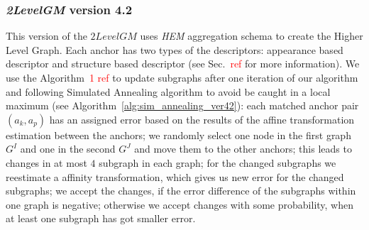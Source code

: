 \documentclass[
	fontsize=12pt,
	paper=a4,
	twoside=false,
	numbers=noenddot,
	plainheadsepline,
	toc=listof,
	toc=bibliography
]{scrartcl}
\newcommand\ToDo[1]{\textcolor{red}{#1}}
\begin{document}
\subsubsection{\emph{2LevelGM} version 4.2}

This version of the $2LevelGM$ uses \emph{HEM} aggregation schema to create the Higher Level Graph. Each anchor has two types of the descriptors: appearance based descriptor and structure based descriptor (see Sec.~\ToDo{ref} for more information). We use the Algorithm~\ToDo{1 ref} to update subgraphs after one iteration of our algorithm and following Simulated Annealing algorithm to avoid be caught in a local maximum (see Algorithm~\ref{alg:sim_annealing_ver42}): each matched anchor pair $(a_k,a_p)$ has an assigned error based on the results of the affine transformation estimation between the anchors; we randomly select one node in the first graph $G^I$ and one in the second $G^J$ and move them to the other anchors; this leads to changes in at most $4$ subgraph in each graph; for the changed subgraphs we reestimate a affinity transformation, which gives us new error for the changed subgraphs; we accept the changes, if the error difference of the subgraphs within one graph is negative; otherwise we accept changes with some probability, when at least one subgraph has got smaller error.
\end{document}
